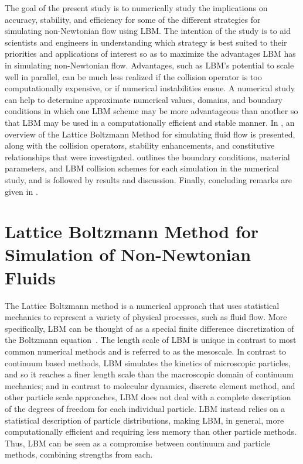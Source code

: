 The goal of the present study is to numerically study the implications on accuracy, stability, and efficiency for some of the different strategies for simulating non-Newtonian flow using LBM. The intention of the study is to aid scientists and engineers in understanding which strategy is best suited to their priorities and applications of interest so as to maximize the advantages LBM has in simulating non-Newtonian flow.
Advantages, such as LBM's potential to scale well in parallel, can be much less realized if the collision operator is too computationally expensive, or if numerical instabilities ensue.
A numerical study can help to determine approximate numerical values, domains, and boundary conditions in which one LBM scheme may be more advantageous than another so that LBM may be used in a computationally efficient and stable manner.
In , an overview of the Lattice Boltzmann Method for simulating fluid flow is presented, along with the collision operators, stability enhancements, and constitutive relationships that were investigated.
 outlines the boundary conditions, material parameters, and LBM collision schemes for each simulation in the numerical study, and is followed by results and discussion.
Finally, concluding remarks are given in .

\section{Lattice Boltzmann Method for Simulation of Non-Newtonian Fluids} \label{sec:LBM}

The Lattice Boltzmann method is a numerical approach that uses statistical mechanics to represent a variety of physical processes, such as fluid flow.
More specifically, LBM can be thought of as a special finite difference discretization of the Boltzmann equation~\cite{chen1998lattice}.
The length scale of LBM is unique in contrast to most common numerical methods and is referred to as the mesoscale.
In contrast to continuum based methods, LBM simulates the kinetics of microscopic particles, and so it reaches a finer length scale than the macroscopic domain of continuum mechanics; and in contrast to molecular dynamics, discrete element method, and other particle scale approaches, LBM does not deal with a complete description of the degrees of freedom for each individual particle.
LBM instead relies on a statistical description of particle distributions, making LBM, in general, more computationally efficient and requiring less memory than other particle methods.
Thus, LBM can be seen as a compromise between continuum and particle methods, combining strengths from each.

